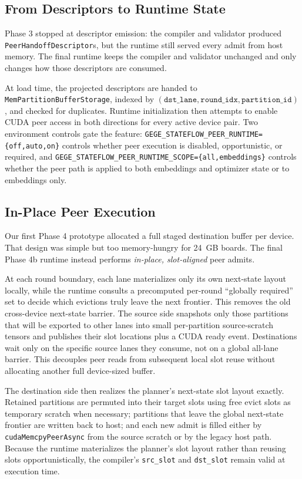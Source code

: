 
\subsection{From Descriptors to Runtime State}

Phase 3 stopped at descriptor emission: the compiler and validator
produced \texttt{PeerHandoffDescriptor}s, but the runtime still served
every admit from host memory. The final runtime keeps the compiler and
validator unchanged and only changes how those descriptors are
consumed.

At load time, the projected descriptors are handed to
\texttt{MemPartitionBufferStorage}, indexed by
$(\texttt{dst\_lane}, \texttt{round\_idx}, \texttt{partition\_id})$,
and checked for duplicates. Runtime initialization then attempts to
enable CUDA peer access in both directions for every active device
pair. Two environment controls gate the feature:
\texttt{GEGE\_STATEFLOW\_PEER\_RUNTIME=\{off,auto,on\}} controls whether
peer execution is disabled, opportunistic, or required, and
\texttt{GEGE\_STATEFLOW\_PEER\_RUNTIME\_SCOPE=\{all,embeddings\}}
controls whether the peer path is applied to both embeddings and
optimizer state or to embeddings only.

\subsection{In-Place Peer Execution}

Our first Phase 4 prototype allocated a full staged destination buffer
per device. That design was simple but too memory-hungry for
\SI{24}{GB} boards. The final Phase 4b runtime instead performs
\emph{in-place, slot-aligned} peer admits.

At each round boundary, each lane materializes only its own next-state
layout locally, while the runtime consults a precomputed per-round
``globally required'' set to decide which evictions truly leave the
next frontier. This removes the old cross-device next-state barrier.
The source side snapshots only those partitions that will be exported
to other lanes into small per-partition source-scratch tensors and
publishes their slot locations plus a CUDA ready event. Destinations
wait only on the specific source lanes they consume, not on a global
all-lane barrier. This decouples peer reads from subsequent local slot
reuse without allocating another full device-sized buffer.

The destination side then realizes the planner's next-state slot layout
exactly. Retained partitions are permuted into their target slots using
free evict slots as temporary scratch when necessary; partitions that
leave the global next-state frontier are written back to host; and each
new admit is filled either by \texttt{cudaMemcpyPeerAsync} from the
source scratch or by the legacy host path. Because the runtime
materializes the planner's slot layout rather than reusing slots
opportunistically, the compiler's \texttt{src\_slot} and
\texttt{dst\_slot} remain valid at execution time.

